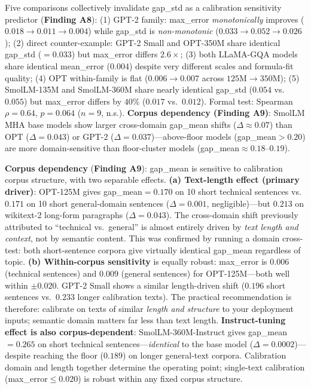 \documentclass{article}
\begin{document}
Five comparisons collectively invalidate gap\_std as a calibration sensitivity predictor (\textbf{Finding A8}): (1) GPT-2 family: max\_error \emph{monotonically} improves ($0.018\to0.011\to0.004$) while gap\_std is \emph{non-monotonic} ($0.033\to0.052\to0.026$); (2) direct counter-example: GPT-2 Small and OPT-350M share identical gap\_std ($=0.033$) but max\_error differs $2.6\times$; (3) both LLaMA-GQA models share identical mean\_error ($0.004$) despite very different scales and formula-fit quality; (4) OPT within-family is flat ($0.006\to0.007$ across $125$M$\to350$M); (5) SmolLM-135M and SmolLM-360M share nearly identical gap\_std ($0.054$ vs.\ $0.055$) but max\_error differs by $40\%$ ($0.017$ vs.\ $0.012$). Formal test: Spearman $\rho=0.64$, $p=0.064$ ($n=9$, n.s.). \textbf{Corpus dependency (Finding A9)}: SmolLM MHA base models show larger cross-domain gap\_mean shifts ($\Delta\approx0.07$) than OPT ($\Delta=0.043$) or GPT-2 ($\Delta=0.037$)---above-floor models (gap\_mean$>0.20$) are more domain-sensitive than floor-cluster models (gap\_mean$\approx0.18$--$0.19$).

\textbf{Corpus dependency} (\textbf{Finding A9}): gap\_mean is sensitive to calibration corpus structure, with two separable effects. \textbf{(a) Text-length effect (primary driver)}: OPT-125M gives gap\_mean$=0.170$ on 10 short technical sentences vs.\ $0.171$ on 10 short general-domain sentences ($\Delta=0.001$, negligible)---but $0.213$ on wikitext-2 long-form paragraphs ($\Delta=0.043$). The cross-domain shift previously attributed to ``technical vs.\ general'' is almost entirely driven by \emph{text length and context}, not by semantic content. This was confirmed by running a domain cross-test: both short-sentence corpora give virtually identical gap\_mean regardless of topic. \textbf{(b) Within-corpus sensitivity} is equally robust: max\_error is $0.006$ (technical sentences) and $0.009$ (general sentences) for OPT-125M---both well within $\pm0.020$. GPT-2 Small shows a similar length-driven shift ($0.196$ short sentences vs.\ $0.233$ longer calibration texts). The practical recommendation is therefore: calibrate on texts of similar \emph{length and structure} to your deployment inputs; semantic domain matters far less than text length. \textbf{Instruct-tuning effect is also corpus-dependent}: SmolLM-360M-Instruct gives gap\_mean$=0.265$ on short technical sentences---\emph{identical} to the base model ($\Delta=0.0002$)---despite reaching the floor ($0.189$) on longer general-text corpora. Calibration domain and length together determine the operating point; single-text calibration (max\_error$\leq0.020$) is robust within any fixed corpus structure.
\end{document}
